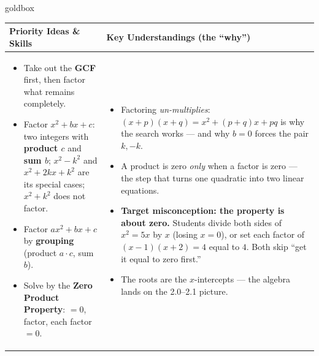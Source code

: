 \documentclass[10pt]{article}
\begin{document}
\renewcommand{\arraystretch}{1.4}
\begin{skillbox}{goldbox}
\begin{tabularx}{\linewidth}{@{}X|X@{}}
\textbf{Priority Ideas \& Skills} & \textbf{Key Understandings (the ``why'')} \\[2pt]
\hline
\vspace{-6pt}
\begin{itemize}[leftmargin=1.1em, nosep, after=\vspace{2pt}]
  \item Take out the \textbf{GCF} first, then factor what remains completely.
  \item Factor $x^2+bx+c$: two integers with \textbf{product $c$} and \textbf{sum $b$};
        $x^2-k^2$ and $x^2+2kx+k^2$ are its special cases; $x^2+k^2$ does not factor.
  \item Factor $ax^2+bx+c$ by \textbf{grouping} (product $a\cdot c$, sum $b$).
  \item Solve by the \textbf{Zero Product Property}: $=0$, factor, each factor $=0$.
\end{itemize}
&
\vspace{-6pt}
\begin{itemize}[leftmargin=1.1em, nosep, after=\vspace{2pt}]
  \item Factoring \emph{un-multiplies}: $(x+p)(x+q)=x^2+(p+q)x+pq$ is why the search works ---
        and why $b=0$ forces the pair $k,-k$.
  \item A product is zero \emph{only} when a factor is zero --- the step that turns one
        quadratic into two linear equations.
  \item \textbf{Target misconception: the property is about zero.} Students divide both sides
        of $x^2=5x$ by $x$ (losing $x=0$), or set each factor of $(x-1)(x+2)=4$ equal to $4$.
        Both skip ``get it equal to zero first.''
  \item The roots are the $x$-intercepts --- the algebra lands on the 2.0--2.1 picture.
\end{itemize}
\end{tabularx}
\end{skillbox}
\end{document}
